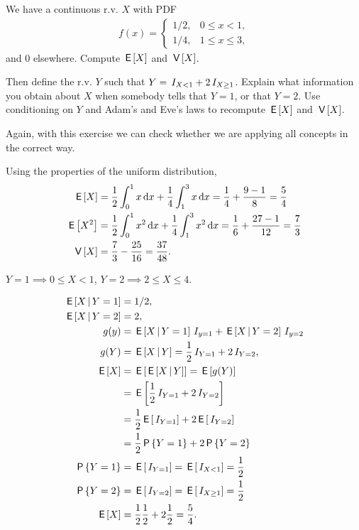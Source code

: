 \begin{exercise}
We have a continuous r.v. $X$ with PDF
\begin{align}
  \label{eq:1123}
  f(x) =
  \begin{cases}
    1/2, & 0\leq x < 1, \\
    1/4, & 1\leq x \leq 3,
  \end{cases}
\end{align}
and $0$ elsewhere. Compute $\,\mathsf{E}\left[X\right]$ and $\,\mathsf{V}\left[X\right]$.

Then define the r.v.
$Y$ such that $Y=\,I_{X< 1} + 2\,I_{X\geq 1}$.
Explain what information you obtain about $X$ when somebody tells that $Y=1$, or that $Y=2$.
Use conditioning on $Y$ and Adam's and Eve's laws to recompute $\,\mathsf{E}\left[X\right]$ and $\,\mathsf{V}\left[X\right]$.

Again, with this exercise we can check whether we are applying all concepts in the correct way.
\begin{solution}

Using the properties of the uniform distribution,
\begin{align}
\,\mathsf{E}\left[X\right] &= \frac{1}{2} \int_0^1 x \,\textrm{d}x + \frac{1}{4} \int_1^3 x \,\textrm{d}x = \frac{1}{4} + \frac{9-1}{8} = \frac{5}{4} \\
\,\mathsf{E}\left[X^2\right] &=  \frac{1}{2}\int_0^{1} x^{2}\,\textrm{d}x + \frac{1}{4}\int_1^{3} x^{2}\,\textrm{d}x = \frac{1}{6} + \frac{27-1}{12} = \frac{7}{3} \\
\,\mathsf{V}\left[X\right] &=  \frac{7}{3} - \frac{25}{16} = \frac{37}{48}.
\end{align}

$Y=1 \implies 0\leq X< 1$,  $Y=2 \implies 2\leq X \leq 4$.

\begin{align}
\,\mathsf{E}\left[X\,\middle|\, Y=1\right] &= 1/2, \\
\,\mathsf{E}\left[X\,\middle|\, Y=2\right] &= 2, \\
g(y) &= \,\mathsf{E}\left[X\,\middle|\, Y=1\right]\,I_{y=1} + \,\mathsf{E}\left[X\,\middle|\, Y=2\right]\,I_{y=2}\\
g(Y) &= \,\mathsf{E}\left[X \,\middle|\, Y\right] = \frac{1}{2} \,I_{Y=1} + 2 \,I_{Y=2},\\
\,\mathsf{E}\left[X\right] &= \,\mathsf{E}\left[\,\mathsf{E}\left[X\,\middle|\, Y\right]\right] = \,\mathsf{E}\left[g(Y)\right] \\
&=\,\mathsf{E}\left[\frac{1}{2} \,I_{Y=1} + 2 \,I_{Y=2}\right] \\
&= \frac{1}{2} \,\mathsf{E}\left[\,I_{Y=1}\right] + 2 \,\mathsf{E}\left[\,I_{Y=2}\right] \\
&= \frac{1}{2} \,\mathsf{P}\left\{Y=1\right\} + 2 \,\mathsf{P}\left\{Y=2\right\} \\
\,\mathsf{P}\left\{Y=1\right\} &= \,\mathsf{E}\left[\,I_{Y=1}\right] = \,\mathsf{E}\left[\,I_{X<1}\right] = \frac{1}{2} \\
\,\mathsf{P}\left\{Y=2\right\} &= \,\mathsf{E}\left[\,I_{Y=2}\right] = \,\mathsf{E}\left[\,I_{X\geq 1}\right] = \frac{1}{2} \\
\,\mathsf{E}\left[X\right] &= \frac{1}{2} \frac{1}{2} + 2 \frac{1}{2} = \frac{5}{4}.
\end{align}



\end{solution}
\end{exercise}

